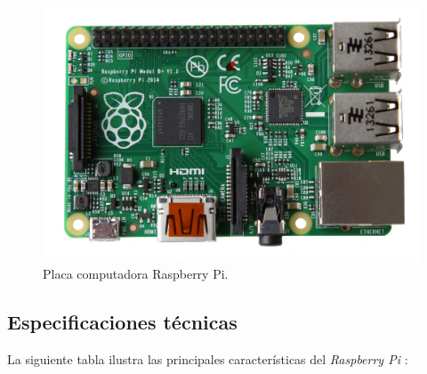 \begin{figure}[H]
	\noindent \begin{centering}
		\includegraphics[width=\linewidth/2]{capitulo3/raspberry}
		\par\end{centering}
	\smallskip
	\caption{\label{fig:raspberry} Placa computadora Raspberry Pi.}
\end{figure} 

\smallskip

\subsection{Especificaciones técnicas}

La siguiente tabla ilustra las principales características del \textit{Raspberry Pi} \cite{raspberry}:

\smallskip

